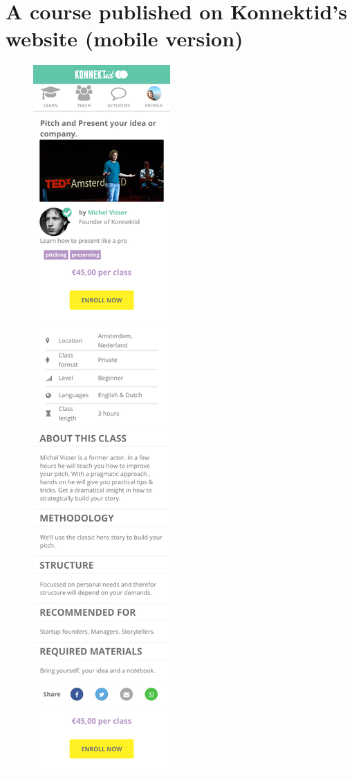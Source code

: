 \newpage

\section{A course published on Konnektid's website (mobile version)}
\label{sec:coursePhone}

\begin{figure}[H]
    \centering
    \includegraphics[scale=0.16]{figure/phoneCoursePage.png}
\end{figure}

